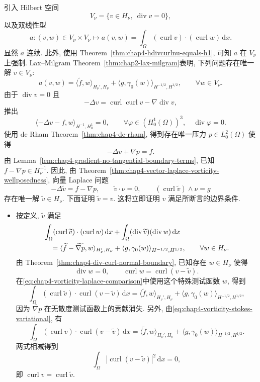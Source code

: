 \begin{Proof}
引入 Hilbert 空间
\[
 V_\nu=\{v\in H_\nu,\ \operatorname{div}v=0\},
\]
以及双线性型
\[
 a:(v,w)\in V_\nu\times V_\nu\longmapsto
 a(v,w)=\int_\Omega(\operatorname{curl}v)\cdot(\operatorname{curl}w)\,\mathrm dx.
\]
显然 $a$ 连续. 此外, 使用 Theorem~\ref{thm:chap4-hdivcurlnu-equals-h1}, 可知 $a$ 在 $V_\nu$ 上强制. Lax--Milgram Theorem~\ref{thm:chap2-lax-milgram}表明, 下列问题存在唯一解 $v\in V_\nu$:
\begin{equation}
 a(v,w)=\langle\widetilde f,w\rangle_{H_\nu',H_\nu}
 +\langle g,\gamma_0(w)\rangle_{H^{-1/2},H^{1/2}},
 \qquad\forall w\in V_\nu.
 \label{eq:chap4-vorticity-stokes-variational}
\end{equation}
由于 $\operatorname{div}v=0$ 且
\[
 -\Delta v=\operatorname{curl}\operatorname{curl}v-\nabla\operatorname{div}v,
\]
推出
\[
 \langle-\Delta v-f,w\rangle_{H^{-1},H_0^1}=0,
 \qquad\forall\varphi\in(H_0^1(\Omega))^3,
 \quad\operatorname{div}\varphi=0.
\]
使用 de Rham Theorem~\ref{thm:chap4-de-rham}, 得到存在唯一压力 $p\in L_0^2(\Omega)$ 使得
\[
 -\Delta v+\nabla p=f.
\]
由 Lemma~\ref{lem:chap4-gradient-no-tangential-boundary-terms}, 已知 $f-\nabla p\in H_\nu^{-1}$. 因此, 由 Theorem~\ref{thm:chap4-vector-laplace-vorticity-wellposedness}, 向量 Laplace 问题
\[
 -\Delta\widetilde v=f-\nabla p,
 \qquad\widetilde v\cdot\nu=0,
 \qquad(\operatorname{curl}\widetilde v)\wedge\nu=g
\]
存在唯一解 $\widetilde v\in H_\nu$. 下面证明 $\widetilde v=v$. 这将立即证明 $v$ 满足所断言的边界条件.

\begin{itemize}
\item 按定义, $\widetilde v$ 满足
\begin{align}
 &\int_\Omega(\operatorname{curl}\widetilde v)\cdot(\operatorname{curl}w)\,\mathrm dx
 +\int_\Omega(\operatorname{div}\widetilde v)(\operatorname{div}w)\,\mathrm dx\notag\\
 &\quad=\langle\widetilde f-\widetilde{\nabla p},w\rangle_{H_\nu',H_\nu}
 +\langle g,\gamma_0(w)\rangle_{H^{-1/2},H^{1/2}},
 \qquad\forall w\in H_\nu.
 \label{eq:chap4-vorticity-laplace-comparison}
\end{align}
由 Theorem~\ref{thm:chap4-div-curl-normal-boundary}, 已知存在 $w\in H_\nu$ 使得
\[
 \operatorname{div}w=0,
 \qquad\operatorname{curl}w=\operatorname{curl}(v-\widetilde v).
\]
在\eqref{eq:chap4-vorticity-laplace-comparison}中使用这个特殊测试函数 $w$, 得到
\[
 \int_\Omega(\operatorname{curl}\widetilde v)\cdot\operatorname{curl}(v-\widetilde v)\,\mathrm dx
 =\langle\widetilde f,w\rangle_{H_\nu',H_\nu}
 +\langle g,\gamma_0(w)\rangle_{H^{-1/2},H^{1/2}},
\]
因为 $\widetilde{\nabla p}$ 在无散度测试函数上的贡献消失. 另外, 由\eqref{eq:chap4-vorticity-stokes-variational}, 有
\[
 \int_\Omega(\operatorname{curl}v)\cdot\operatorname{curl}(v-\widetilde v)\,\mathrm dx
 =\langle\widetilde f,w\rangle_{H_\nu',H_\nu}
 +\langle g,\gamma_0(w)\rangle_{H^{-1/2},H^{1/2}}.
\]
两式相减得到
\[
 \int_\Omega|\operatorname{curl}(v-\widetilde v)|^2\,\mathrm dx=0,
\]
即 $\operatorname{curl}v=\operatorname{curl}\widetilde v$.


\end{itemize}
\end{Proof}
